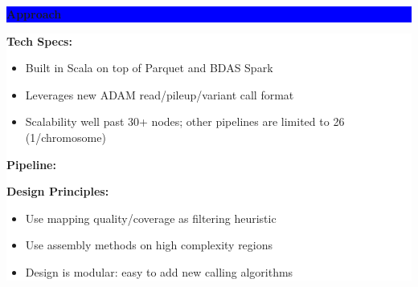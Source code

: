 \documentclass[11pt]{a0poster}
\begin{document}
{\begin{minipage}[t][2045pt][t]{\linewidth}
\begin{minipage}{0.3\linewidth}
\vspace{75pt}
\colorbox{Blue}{
\begin{minipage}{\linewidth}
\vspace{25pt}
\begin{center}
\Huge \bf \color{White} Approach
\end{center}
\vspace{10pt}
\end{minipage}
}
\colorbox{White}{
\begin{minipage}[t][985pt][t]{\linewidth}
\color{Blue}
\vspace{20pt}
\LARGE
\textbf{Tech Specs:}
\begin{itemize}
\item Built in Scala on top of Parquet and BDAS Spark
\item Leverages new ADAM read/pileup/variant call format
\item Scalability well past 30+ nodes; other pipelines are limited to 26 (1/chromosome)
\end{itemize}
\textbf{Pipeline:} \\
\begin{center}
\end{center} 
\textbf{Design Principles:}
\begin{itemize}
\item Use mapping quality/coverage as filtering heuristic
\item Use assembly methods on high complexity regions
\item Design is modular: easy to add new calling algorithms
\end{itemize}
\pagebreak
\end{minipage}
}
\pagebreak
\end{minipage}
\begin{minipage}{0.03\linewidth}
\hfill
\pagebreak
\end{minipage}
\begin{minipage}{0.6\linewidth}


\end{minipage}
\end{minipage}}
\end{document}
